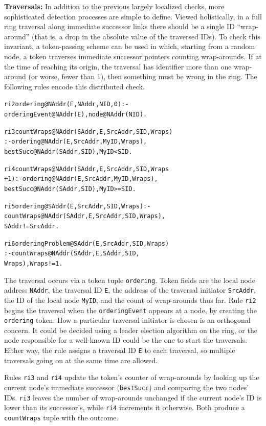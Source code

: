 \documentclass{sig-alt-full}
\renewcommand{\paragraph}[1]{{\bf #1:}}
\newenvironment{overlog}{\begin{alltt}\footnotesize}{\end{alltt}}
\newcommand{\ol}[1]{{\tt\footnotesize#1}}
\begin{document}
\paragraph{Traversals}
In addition to the previous largely localized checks,
more sophisticated detection processes are simple to
define.  Viewed holistically, in a full ring traversal
along immediate successor links there should be a single
ID ``wrap-around'' (that is, a drop in the absolute
value of the traversed IDs).  To check this invariant, a
token-passing scheme can be used in which, starting from
a random node, a token traverses immediate successor
pointers counting wrap-arounds.  If at the time of
reaching its origin, the traversal has identifier more
than one wrap-around (or worse, fewer than 1), then
something must be wrong in the ring.  The
following rules encode this distributed check.
\begin{overlog}
ri2 ordering@NAddr(E, NAddr, NID, 0) :-
   orderingEvent@NAddr(E), node@NAddr(NID).

ri3 countWraps@NAddr(SAddr, E, SrcAddr, SID, Wraps)
   :- ordering@NAddr(E, SrcAddr, MyID, Wraps),
   bestSucc@NAddr(SAddr, SID), MyID < SID.

ri4 countWraps@NAddr(SAddr, E, SrcAddr, SID, Wraps
   + 1) :- ordering@NAddr(E, SrcAddr, MyID, Wraps),
   bestSucc@NAddr(SAddr, SID), MyID >= SID.

ri5 ordering@SAddr(E, SrcAddr, SID, Wraps) :-
   countWraps@NAddr(SAddr, E, SrcAddr, SID, Wraps),
   SAddr != SrcAddr.

ri6 orderingProblem@SAddr(E, SrcAddr, SID, Wraps)
   :- countWraps@NAddr(SAddr, E, SAddr, SID,
   Wraps), Wraps != 1.
\end{overlog}
The traversal occurs via a token tuple
\ol{ordering}. Token fields are the local node address
\ol{NAddr}, the traversal ID \ol{E}, the address of
the traversal initiator \ol{SrcAddr}, the ID of the
local node \ol{MyID}, and the count of wrap-arounds
thus far.  Rule \ol{ri2} begins the traversal
when the \ol{orderingEvent} appears at a node, by
creating the \ol{ordering} token.  How a particular
traversal initiator is chosen is an orthogonal concern.
It could be decided using a leader election algorithm on
the ring, or the node responsible for a well-known ID could
be the one to start the traversals.  Either way, the
rule assigns a traversal ID \ol{E} to each traversal,
so multiple traversals going on at the same time are
allowed.

Rules \ol{ri3} and \ol{ri4} update the token's counter
of wrap-arounds by looking up the current node's
immediate successor (\ol{bestSucc}) and comparing the
two nodes' IDs. \ol{ri3} leaves the number of
wrap-arounds unchanged if the current node's ID is
lower than its successor's, while \ol{ri4} increments it
otherwise.  Both produce a \ol{countWraps} tuple with the outcome.
\end{document}
